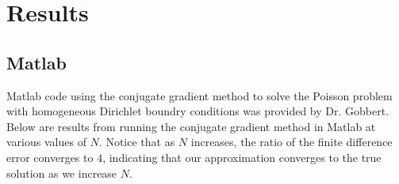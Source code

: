 \documentclass[11pt]{article}
\begin{document}
\section{Results}
\subsection{Matlab}
Matlab code using the conjugate gradient method to solve the Poisson problem with homogeneous Dirichlet boundry conditions was provided by Dr. Gobbert. Below are results from running the conjugate gradient method in Matlab at various values of $N$. Notice that as $N$ increases, the ratio of the finite difference error converges to $4$, indicating that our approximation converges to the true solution as we increase $N$.
\begin{table}[!htbp]
\end{table}
\end{document}
